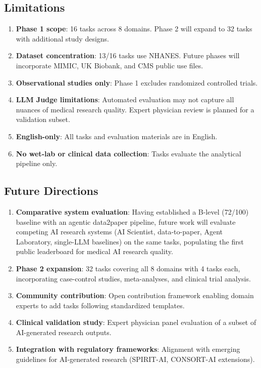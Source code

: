 \documentclass[12pt]{article}
\begin{document}
\subsection{Limitations}

\begin{enumerate}
\item \textbf{Phase 1 scope}: 16 tasks across 8 domains. Phase 2 will expand to 32 tasks with additional study designs.
\item \textbf{Dataset concentration}: 13/16 tasks use NHANES. Future phases will incorporate MIMIC, UK Biobank, and CMS public use files.
\item \textbf{Observational studies only}: Phase 1 excludes randomized controlled trials.
\item \textbf{LLM Judge limitations}: Automated evaluation may not capture all nuances of medical research quality. Expert physician review is planned for a validation subset.
\item \textbf{English-only}: All tasks and evaluation materials are in English.
\item \textbf{No wet-lab or clinical data collection}: Tasks evaluate the analytical pipeline only.
\end{enumerate}

\subsection{Future Directions}

\begin{enumerate}
\item \textbf{Comparative system evaluation}: Having established a B-level (72/100) baseline with an agentic data2paper pipeline, future work will evaluate competing AI research systems (AI Scientist, data-to-paper, Agent Laboratory, single-LLM baselines) on the same tasks, populating the first public leaderboard for medical AI research quality.
\item \textbf{Phase 2 expansion}: 32 tasks covering all 8 domains with 4 tasks each, incorporating case-control studies, meta-analyses, and clinical trial analysis.
\item \textbf{Community contribution}: Open contribution framework enabling domain experts to add tasks following standardized templates.
\item \textbf{Clinical validation study}: Expert physician panel evaluation of a subset of AI-generated research outputs.
\item \textbf{Integration with regulatory frameworks}: Alignment with emerging guidelines for AI-generated research (SPIRIT-AI, CONSORT-AI extensions).
\end{enumerate}
\end{document}
